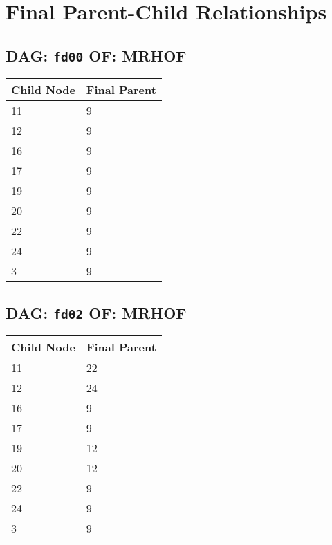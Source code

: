 \documentclass{article}
\begin{document}
\pagestyle{fancy}
\fancyhf{}
\section*{Final Parent-Child Relationships}
\subsection*{DAG: \texttt{fd00} OF: MRHOF}
\begin{tabular}{ll}
\toprule
\textbf{Child Node} & \textbf{Final Parent} \\
\midrule
11 & 9 \\
12 & 9 \\
16 & 9 \\
17 & 9 \\
19 & 9 \\
20 & 9 \\
22 & 9 \\
24 & 9 \\
3 & 9 \\
\bottomrule
\end{tabular}

\subsection*{DAG: \texttt{fd02} OF: MRHOF}
\begin{tabular}{ll}
\toprule
\textbf{Child Node} & \textbf{Final Parent} \\
\midrule
11 & 22 \\
12 & 24 \\
16 & 9 \\
17 & 9 \\
19 & 12 \\
20 & 12 \\
22 & 9 \\
24 & 9 \\
3 & 9 \\
\bottomrule
\end{tabular}
\end{document}
